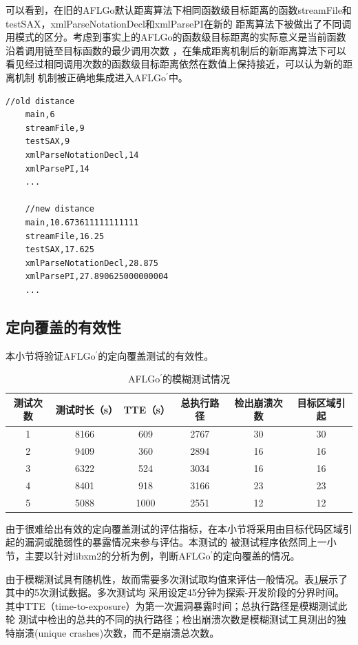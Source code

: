 \documentclass[bachelor]{njupthesis}
\begin{document}
可以看到，在旧的AFLGo默认距离算法下相同函数级目标距离的函数streamFile和testSAX，xmlParseNotationDecl和xmlParsePI在新的
距离算法下被做出了不同调用模式的区分。考虑到事实上的AFLGo的函数级目标距离的实际意义是当前函数沿着调用链至目标函数的最少调用次数
，在集成距离机制后的新距离算法下可以看见经过相同调用次数的函数级目标距离依然在数值上保持接近，可以认为新的距离机制
机制被正确地集成进入AFLGo$^\prime$中。

\renewcommand{\thelstlisting}{5.\arabic{lstlisting}}
\begin{lstlisting}[caption={先后目标距离对比},label={code:callsite},basicstyle=\linespread{0.85}\ttfamily\small]
	//old distance
	main,6
	streamFile,9
	testSAX,9
	xmlParseNotationDecl,14
	xmlParsePI,14
	...

	//new distance
	main,10.673611111111111
	streamFile,16.25
	testSAX,17.625
	xmlParseNotationDecl,28.875	
	xmlParsePI,27.890625000000004	
	...
\end{lstlisting}
\subsection{定向覆盖的有效性}
本小节将验证AFLGo$^\prime$的定向覆盖测试的有效性。

\begin{table}[htbp]
	\centering
	\caption{AFLGo$^\prime$的模糊测试情况}\label{tab:aflgop}
	\begin{tabular}{|c|c|c|c|c|c|}
	  \hline
	  测试次数 & 测试时长（s）& TTE（s）&总执行路径& 检出崩溃次数 &目标区域引起 \\
	  \hline
	  1 & 8166 & 609 & 2767  &30 & 30\\
	  \hline
	  2 & 9409 & 360 & 2894  &16& 16\\
	  \hline
	  3 & 6322 & 524 & 3034  & 16& 16\\
	  \hline
	  4 & 8401 & 918 & 3166 &  23 & 23\\
	  \hline 
	  5 & 5088 & 1000 & 2551&  12 & 12\\
	  \hline  
	\end{tabular}
\end{table}
\vspace{6pt}
由于很难给出有效的定向覆盖测试的评估指标，在本小节将采用由目标代码区域引起的漏洞或脆弱性的暴露情况来参与评估。本测试的
被测试程序依然同上一小节，主要以针对libxm2的分析为例，判断AFLGo$^\prime$的定向覆盖的情况。

由于模糊测试具有随机性，故而需要多次测试取均值来评估一般情况。表\ref{tab:aflgop}展示了其中的5次测试数据。多次测试均
采用设定45分钟为探索-开发阶段的分界时间。其中TTE（time-to-exposure）为第一次漏洞暴露时间；总执行路径是模糊测试此轮
测试中检出的总共的不同的执行路径；检出崩溃次数是模糊测试工具测出的独特崩溃(unique crashes)次数，而不是崩溃总次数。
\end{document}
